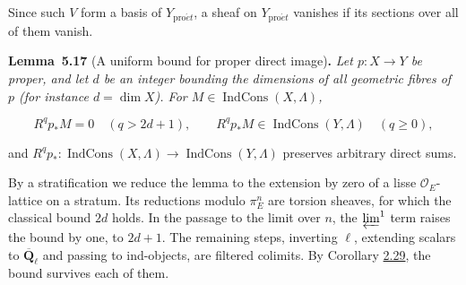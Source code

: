 \documentclass[11pt]{article}
\newenvironment{bpstatement}[2]{\par\addvspace{0.6\baselineskip}\noindent\textbf{#1}#2\textbf{.}\enspace\ignorespaces}
  {\par\addvspace{0.4\baselineskip}}
\newenvironment{bpstatementit}[2]{\begin{bpstatement}{#1}{#2}\itshape\ignorespaces}{\end{bpstatement}}
\providecommand{\IndCons}{}\renewcommand{\IndCons}{\operatorname{IndCons}}
\begin{document}
Since such \(V\) form a basis of \(Y_{\mathrm{pro}\acute{e}t}\), a sheaf on \(Y_{\mathrm{pro}\acute{e}t}\) vanishes if its sections over all of them vanish.

\label{bp463}%
\begin{bpstatementit}{Lemma~5.17}{ (A uniform bound for proper direct image)}
Let \(p:X\to Y\) be proper, and let \(d\) be an integer bounding the dimensions of all geometric fibres of \(p\) (for instance \(d=\dim X\)). For \(M\in\IndCons(X,\Lambda)\),

\[
R^qp_*M=0\quad(q>2d+1),\qquad R^qp_*M\in\IndCons(Y,\Lambda)\quad(q\geq0),
\]

and \(R^qp_*:\IndCons(X,\Lambda)\to\IndCons(Y,\Lambda)\) preserves arbitrary direct sums.
\end{bpstatementit}

\label{bp464}%
By a stratification we reduce the lemma to the extension by zero of a lisse \(\mathcal O_E\)-lattice on a stratum. Its reductions modulo \(\pi_E^n\) are torsion sheaves, for which the classical bound \(2d\) holds. In the passage to the limit over \(n\), the \(\varprojlim^1\) term raises the bound by one, to \(2d+1\). The remaining steps, inverting \(\ell\), extending scalars to \(\overline{\mathbf Q}_\ell\) and passing to ind-objects, are filtered colimits. By Corollary \hyperref[bp86]{2.29}, the bound survives each of them.
\end{document}
